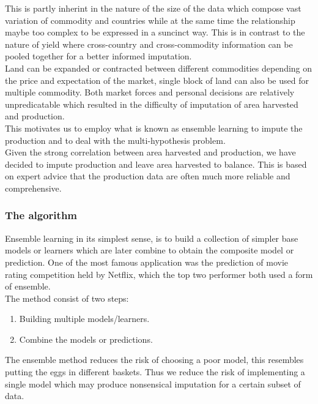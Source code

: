 \documentclass[nojss]{jss}\usepackage[]{graphicx}\usepackage[]{color}
\begin{document}
This is partly inherint in the nature of the size of the data which
compose vast variation of commodity and countries while at the same
time the relationship maybe too complex to be expressed in a suncinct
way. This is in contrast to the nature of yield where cross-country
and cross-commodity information can be pooled together for a better
informed imputation.\\

Land can be expanded or contracted between different commodities
depending on the price and expectation of the market, single block of
land can also be used for multiple commodity. Both market forces and
personal decisions are relatively unpredicatable which resulted in the
difficulty of imputation of area harvested and production.\\

This motivates us to employ what is known as ensemble learning to
impute the production and to deal with the multi-hypothesis
problem. \\

Given the strong correlation between area harvested and production, we
have decided to impute production and leave area harvested to balance.
This is based on expert advice that the production data are often much
more reliable and comprehensive.\\


\subsubsection{The algorithm}
Ensemble learning in its simplest sense, is to build a collection of
simpler base models or learners which are later combine to obtain the
composite model or prediction. One of the most famous application was
the prediction of movie rating competition held by Netflix, which the
top two performer both used a form of ensemble. \\


The method consist of two steps:
\begin{enumerate}
  \item Building multiple models/learners.
  \item Combine the models or predictions.
\end{enumerate}


The ensemble method reduces the risk of choosing a poor model, this
resembles putting the eggs in different baskets. Thus we reduce the
risk of implementing a single model which may produce nonsensical
imputation for a certain subset of data.\\
\end{document}
